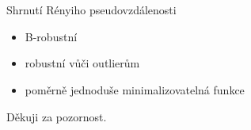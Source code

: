 \documentclass[11pt,a4paper]{beamer}
\begin{document}
%
\section{}
\begin{frame}{Shrnutí}
	Rényiho pseudovzdálenosti
	\begin{itemize}
		\item B-robustní		
		\item robustní vůči outlierům
  		\item poměrně jednoduše minimalizovatelná funkce
		
	\end{itemize}
\end{frame}



\begin{frame}
	\begin{center}
		Děkuji za pozornost.
	\end{center}
\end{frame}
\end{document}
